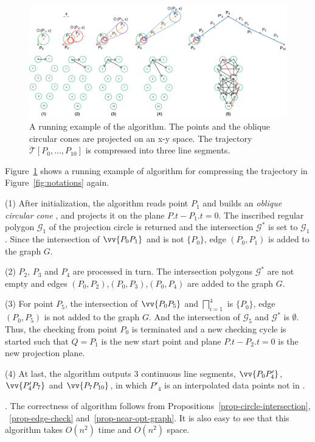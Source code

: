 \begin{figure}[tb!]
	\centering
	\includegraphics[scale=0.8]{figures/Fig-CISED-O.png}
	\caption{\small A running example of the \cisto algorithm. The points and the oblique circular cones are projected on an x-y space. The trajectory $\dddot{\mathcal{T}}[P_0, \ldots, P_{10}]$ is compressed into three line segments.}
	\vspace{-1ex}
	\label{fig:exm-consto}
\end{figure}


\begin{example}
\label{exm-alg-conesto}
Figure~\ref{fig:exm-consto}  shows a running example of algorithm \cisto for compressing the trajectory  in Figure~\ref{fig:notations} again.


\sstab (1) After initialization, the \cisto algorithm reads point $P_1$ and
builds an \emph{oblique circular cone} ,  and projects it on the plane $P.t-P_1.t=0$. The inscribed
regular polygon $\mathcal{G}_1$ of the projection circle  is returned and the intersection $\mathcal{G}^*$ is set to $\mathcal{G}_1$.
Since the intersection of $\vv{P_0P_{1}}$ and  is not $\{P_0\}$, edge
$(P_0,P_{1})$ is added to the graph $G$. 


\sstab (2) $P_2$, $P_3$ and $P_4$ are processed in turn. The intersection
polygons $\mathcal{G}^*$ are not empty and edges $(P_0,P_{2})$,$(P_0,P_{3})$,$(P_0,P_{4})$ are added to the graph $G$. 


\sstab (3) For point $P_5$, the intersection of $\vv{P_0P_{5}}$ and $\bigsqcap_{i=1}^{
  4}$ is $\{P_0\}$, edge
$(P_0,P_{5})$ is not added to the graph $G$. 
And the intersection of $\mathcal{G}_5$ and $\mathcal{G}^*$ is $\emptyset$.
Thus, the checking from point $P_0$ is terminated and  a new  checking cycle is started such that $Q=P_1$ is the new start point and plane $P.t-P_2.t=0$ is the new projection plane.

\sstab (4) At last, the algorithm outputs 3 continuous line segments, \ie $\vv{P_0P'_4}$, $\vv{P'_4P_7}$ and $\vv{P_7P_{10}}$, in which $P'_4$ is an interpolated data points not in .
\end{example}



.
The correctness of algorithm \cisto follows from Propositions~\ref{prop-circle-intersection}, ~\ref{prop-edge-check} and~\ref{prop-near-opt-graph}.
It is also easy to see that this algorithm takes $O(n^2)$ time and $O(n^2)$ space.

